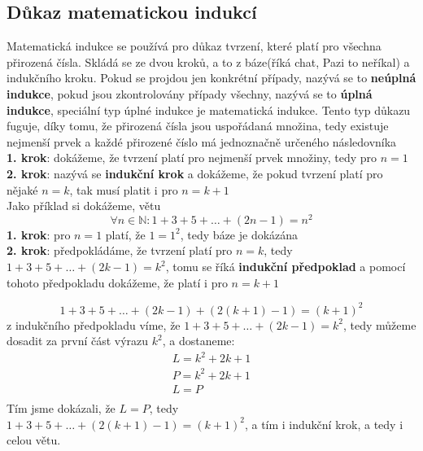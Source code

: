 \documentclass[12pt]{article}
\begin{document}
\subsection*{Důkaz matematickou indukcí}
Matematická indukce se používá pro důkaz tvrzení, které platí pro všechna přirozená čísla. Skládá se ze dvou kroků, a to z báze(říká chat, Pazi to neříkal) a indukčního kroku. Pokud se projdou jen konkrétní případy, nazývá se to \textbf{neúplná indukce}, pokud jsou zkontrolovány případy všechny, nazývá se to \textbf{úplná indukce}, speciální typ úplné indukce je matematická indukce. Tento typ důkazu fuguje, díky tomu, že přirozená čísla jsou uspořádaná množina, tedy existuje nejmenší prvek a každé přirozené číslo má jednoznačně určeného následovníka\\
\textbf{1. krok}: dokážeme, že tvrzení platí pro nejmenší prvek množiny, tedy pro $n = 1$\\
\textbf{2. krok}: nazývá se \textbf{indukční krok} a dokážeme, že pokud tvrzení platí pro nějaké $n = k$, tak musí platit i pro $n = k + 1$\\
Jako příklad si dokážeme, větu \[\forall n \in \mathbb{N}:1 + 3 + 5 + \dots + (2n-1) = n^2\]
\textbf{1. krok}: pro $n = 1$ platí, že $1 = 1^2$, tedy báze je dokázána\\
\textbf{2. krok}: předpokládáme, že tvrzení platí pro $n = k$, tedy $1 + 3 + 5 + \dots + (2k-1) = k^2$, tomu se říká \textbf{indukční předpoklad} a pomocí tohoto předpokladu dokážeme, že platí i pro $n = k + 1$

\[1 + 3 + 5 + \dots + (2k-1) + (2(k+1)-1) = (k+1)^2\]
z indukčního předpokladu víme, že $1 + 3 + 5 + \dots + (2k-1) = k^2$, tedy můžeme dosadit za první část výrazu $k^2$, a dostaneme:
\begin{align*}
L = k^2 + 2k + 1\\
P = k^2 + 2k + 1\\
L = P\\
\end{align*}
Tím jsme dokázali, že $L = P$, tedy $1 + 3 + 5 + \dots + (2(k+1)-1) = (k+1)^2$, a tím i indukční krok, a tedy i celou větu.\\
\end{document}

